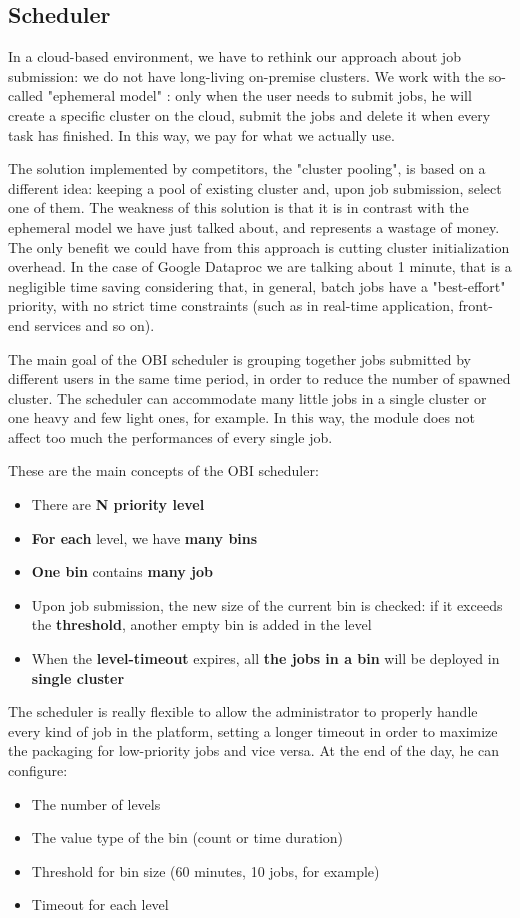 \documentclass[12pt,twoside,cucitura]{toptesi}
\begin{document}
\subsection{Scheduler}
In a cloud-based environment, we have to rethink our approach about job submission: we do not have long-living on-premise clusters. We work with the so-called "ephemeral model" \cite{ephemeral_model}: only when the user needs to submit jobs, he will create a specific cluster on the cloud, submit the jobs and delete it when every task has finished. In this way, we pay for what we actually use. 

The solution implemented by competitors, the "cluster pooling", is based on a different idea: keeping a pool of existing cluster and, upon job submission, select one of them. The weakness of this solution is that it is in contrast with the ephemeral model we have just talked about, and represents a wastage of money.  The only benefit we could have from this approach is cutting cluster initialization overhead. In the case of Google Dataproc we are talking about 1 minute, that is a negligible time saving considering that, in general, batch jobs have a "best-effort" priority, with no strict time constraints (such as in real-time application, front-end services and so on).

The main goal of the OBI scheduler is grouping together jobs submitted by different users in the same time period, in order to reduce the number of spawned cluster. The scheduler can accommodate many little jobs in a single cluster or one heavy and few light ones, for example. In this way, the module does not affect too much the performances of every single job. 

These are the main concepts of the OBI scheduler:
\begin{itemize}
  \item There are \textbf{N priority level}
  \item \textbf{For each} level, we have \textbf{many bins}
  \item \textbf{One bin} contains \textbf{many job}
  \item Upon job submission, the new size of the current bin is checked: if it exceeds the \textbf{threshold}, another empty bin is added in the level
  \item When the \textbf{level-timeout} expires, all \textbf{the jobs in a bin} will be deployed in \textbf{single cluster}
\end{itemize}
					
The scheduler is really flexible to allow the administrator to properly handle every kind of job in the platform, setting a longer timeout in order to maximize the packaging for low-priority jobs and vice versa. At the end of the day, he can configure:
\begin{itemize}
  \item The number of levels
  \item The value type of the bin (count or time duration)
  \item Threshold for bin size (60 minutes, 10 jobs, for example)
  \item Timeout for each level 
\end{itemize}
\end{document}
